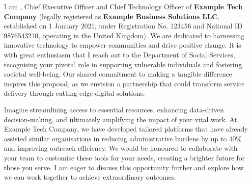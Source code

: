 \begin{letter}{\recipientaddress}

\thispagestyle{fancy}  %

  \vspace*{-0.5cm}  %
  

	\opening{\salutation}  %

	\subjectline  %
 
I am \textbf{\sendername}, Chief Executive Officer and Chief Technology Officer of \textbf{Example Tech Company} (legally registered as \textbf{Example Business Solutions LLC}, established on 1 January 2021, under Registration No. 123456 and National ID 9876543210, operating in the United Kingdom). We are dedicated to harnessing innovative technology to empower communities and drive positive change. It is with great enthusiasm that I reach out to the Department of Social Services, recognising your pivotal role in supporting vulnerable individuals and fostering societal well-being. Our shared commitment to making a tangible difference inspires this proposal, as we envision a partnership that could transform service delivery through cutting-edge digital solutions.

Imagine streamlining access to essential resources, enhancing data-driven decision-making, and ultimately amplifying the impact of your vital work. At Example Tech Company, we have developed tailored platforms that have already assisted similar organisations in reducing administrative burdens by up to 40\% and improving outreach efficiency. We would be honoured to collaborate with your team to customise these tools for your needs, creating a brighter future for those you serve. I am eager to discuss this opportunity further and explore how we can work together to achieve extraordinary outcomes.

 	\closing{\closingphrase}
 

\end{letter}
